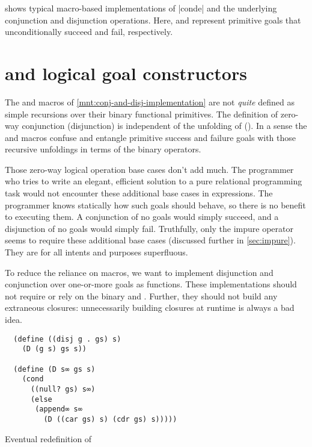 \documentclass[sigplan,draft,balance,pbalance,natbib=false]{acmart}
\begin{document}
 shows typical macro-based
implementations of \rackinline|conde| and the underlying conjunction
and disjunction operations. Here,  and 
represent primitive goals that unconditionally succeed and fail,
respectively.

\section{ and  logical goal
  constructors}\label{sec:conde}

The   and  macros of
\cref{mnt:conj-and-disj-implementation} are not \emph{quite} defined
as simple recursions over their binary functional primitives. The
definition of zero-way conjunction (disjunction) is independent of the
unfolding of  (). In a sense the
 and  macros confuse and entangle
primitive success and failure goals with those recursive unfoldings in
terms of the binary operators.

Those zero-way logical operation base cases don't add much. The
programmer who tries to write an elegant, efficient solution to a pure
relational programming task would not encounter these additional base
cases in  expressions. The programmer knows
statically how such goals should behave, so there is no benefit to
executing them. A conjunction of no goals would simply succeed, and a
disjunction of no goals would simply fail. Truthfully, only the impure
 operator seems to require these additional base
cases (discussed further in \cref{sec:impure}). They are for all
intents and purposes superfluous.

To reduce the reliance on macros, we want to implement disjunction and
conjunction over one-or-more goals as functions. These implementations
should not require  or rely on the binary
 and . Further, they should not
build any extraneous closures: unnecessarily building closures at
runtime is always a bad idea.

\begin{listing}
  \begin{verbatim}
  (define ((disj g . gs) s)
    (D (g s) gs s))

  (define (D s∞ gs s)
    (cond
      ((null? gs) s∞)
      (else
       (append∞ s∞
         (D ((car gs) s) (cdr gs) s)))))
  \end{verbatim}
  \caption{Eventual redefinition of }
  \label{mnt:disj-reimplementation}
\end{listing}
\end{document}
